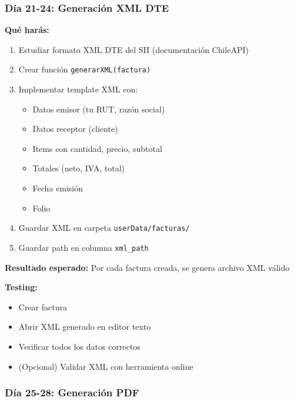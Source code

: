 \documentclass[11pt,a4paper]{article}
\begin{document}
\subsubsection{Día 21-24: Generación XML DTE}

\textbf{Qué harás:}
\begin{enumerate}
    \item Estudiar formato XML DTE del SII (documentación ChileAPI)
    \item Crear función \texttt{generarXML(factura)}
    \item Implementar template XML con:
    \begin{itemize}
        \item Datos emisor (tu RUT, razón social)
        \item Datos receptor (cliente)
        \item Items con cantidad, precio, subtotal
        \item Totales (neto, IVA, total)
        \item Fecha emisión
        \item Folio
    \end{itemize}
    \item Guardar XML en carpeta \texttt{userData/facturas/}
    \item Guardar path en columna \texttt{xml\_path}
\end{enumerate}

\textbf{Resultado esperado:} Por cada factura creada, se genera archivo XML válido

\textbf{Testing:}
\begin{itemize}
    \item Crear factura
    \item Abrir XML generado en editor texto
    \item Verificar todos los datos correctos
    \item (Opcional) Validar XML con herramienta online
\end{itemize}

\subsubsection{Día 25-28: Generación PDF}
\end{document}
